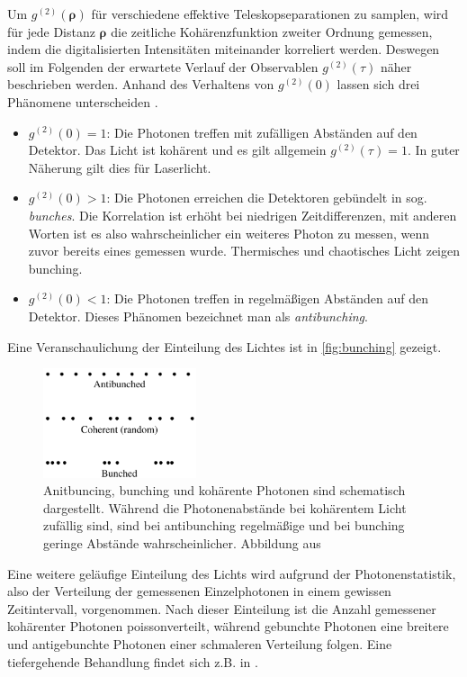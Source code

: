 Um $g^{(2)}(\bm{\rho})$ für verschiedene effektive Teleskopseparationen zu samplen, wird für jede Distanz $\bm{\rho}$ die zeitliche Kohärenzfunktion zweiter Ordnung gemessen, indem die digitalisierten Intensitäten miteinander korreliert werden. 
Deswegen soll im Folgenden der erwartete Verlauf der Observablen $g^{(2)}(\tau)$ näher beschrieben werden. 
Anhand des Verhaltens von $g^{(2)}(0)$ lassen sich drei Phänomene unterscheiden \cite{foxQuantumOpticsIntroduction2006}. 
\begin{itemize}
    \item $g^{(2)}(0)=1$: Die Photonen treffen mit zufälligen Abständen auf den Detektor. Das Licht ist kohärent und es gilt allgemein $g^{(2)}(\tau)=1$. In guter Näherung gilt dies für Laserlicht.
    \item $g^{(2)}(0)>1$: Die Photonen erreichen die Detektoren gebündelt in sog. \emph{bunches}. Die Korrelation ist erhöht bei niedrigen Zeitdifferenzen, mit anderen Worten ist es also wahrscheinlicher ein weiteres Photon zu messen, wenn zuvor bereits eines gemessen wurde. Thermisches und chaotisches Licht zeigen bunching.
    \item $g^{(2)}(0)<1$: Die Photonen treffen in regelmäßigen Abständen auf den Detektor. Dieses Phänomen bezeichnet man als \emph{antibunching}. 
\end{itemize}
Eine Veranschaulichung der Einteilung des Lichtes ist in \autoref{fig:bunching} gezeigt. 
\begin{figure}[htbp]
    \centering
    \includegraphics[width=0.4\textwidth]{images/Theorie/Fox_6.6.png}
    \caption{Anitbuncing, bunching und kohärente Photonen sind schematisch dargestellt. Während die Photonenabstände bei kohärentem Licht zufällig sind, sind bei antibunching regelmäßige und bei bunching geringe Abstände wahrscheinlicher. Abbildung aus \cite[Fig. 6.6]{foxQuantumOpticsIntroduction2006}}
    \label{fig:bunching}
\end{figure}
Eine weitere geläufige Einteilung des Lichts wird aufgrund der Photonenstatistik, also der Verteilung der gemessenen Einzelphotonen in einem gewissen Zeitintervall, vorgenommen. 
Nach dieser Einteilung ist die Anzahl gemessener kohärenter Photonen poissonverteilt, während gebunchte Photonen eine breitere und antigebunchte Photonen einer schmaleren Verteilung folgen. 
Eine tiefergehende Behandlung findet sich z.B. in \cite[Kap. 5.4-5.6]{foxQuantumOpticsIntroduction2006}. \\

